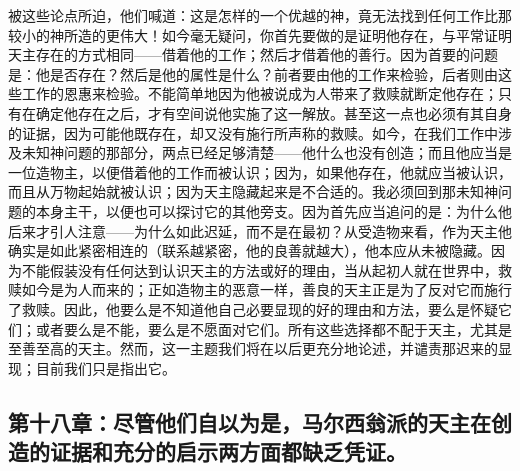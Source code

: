 被这些论点所迫，他们喊道：这是怎样的一个优越的神，竟无法找到任何工作比那较小的神所造的更伟大！如今毫无疑问，你首先要做的是证明他存在，与平常证明天主存在的方式相同——借着他的工作；然后才借着他的善行。因为首要的问题是：他是否存在？然后是他的属性是什么？前者要由他的工作来检验，后者则由这些工作的恩惠来检验。不能简单地因为他被说成为人带来了救赎就断定他存在；只有在确定他存在之后，才有空间说他实施了这一解放。甚至这一点也必须有其自身的证据，因为可能他既存在，却又没有施行所声称的救赎。如今，在我们工作中涉及未知神问题的那部分，两点已经足够清楚——他什么也没有创造；而且他应当是一位造物主，以便借着他的工作而被认识；因为，如果他存在，他就应当被认识，而且从万物起始就被认识；因为天主隐藏起来是不合适的。我必须回到那未知神问题的本身主干，以便也可以探讨它的其他旁支。因为首先应当追问的是：为什么他后来才引人注意——为什么如此迟延，而不是在最初？从受造物来看，作为天主他确实是如此紧密相连的（联系越紧密，他的良善就越大），他本应从未被隐藏。因为不能假装没有任何达到认识天主的方法或好的理由，当从起初人就在世界中，救赎如今是为人而来的；正如造物主的恶意一样，善良的天主正是为了反对它而施行了救赎。因此，他要么是不知道他自己必要显现的好的理由和方法，要么是怀疑它们；或者要么是不能，要么是不愿面对它们。所有这些选择都不配于天主，尤其是至善至高的天主。然而，这一主题我们将在以后更充分地论述，并谴责那迟来的显现；目前我们只是指出它。\par


\subsection{第十八章：尽管他们自以为是，马尔西翁派的天主在创造的证据和充分的启示两方面都缺乏凭证。}

